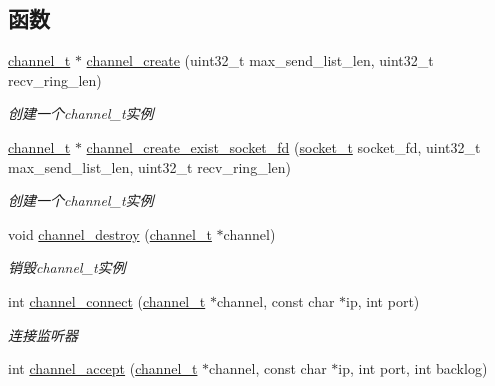 \subsection*{函数}
\begin{DoxyCompactItemize}
\item 
\hyperlink{a00050_a2effb3e20d0b7e5f6d5ac42118e0330b_a2effb3e20d0b7e5f6d5ac42118e0330b}{channel\+\_\+t} $\ast$ \hyperlink{a00045_ac2250584fc8b99ed26a4bbe4750cce61_ac2250584fc8b99ed26a4bbe4750cce61}{channel\+\_\+create} (uint32\+\_\+t max\+\_\+send\+\_\+list\+\_\+len, uint32\+\_\+t recv\+\_\+ring\+\_\+len)
\begin{DoxyCompactList}\small\item\em 创建一个channel\+\_\+t实例 \end{DoxyCompactList}\item 
\hyperlink{a00050_a2effb3e20d0b7e5f6d5ac42118e0330b_a2effb3e20d0b7e5f6d5ac42118e0330b}{channel\+\_\+t} $\ast$ \hyperlink{a00045_a9fe31ed96008befaf02f50568b59a199_a9fe31ed96008befaf02f50568b59a199}{channel\+\_\+create\+\_\+exist\+\_\+socket\+\_\+fd} (\hyperlink{a00050_a0d9e0afbf02fb6ed6c5b1415dce51b05_a0d9e0afbf02fb6ed6c5b1415dce51b05}{socket\+\_\+t} socket\+\_\+fd, uint32\+\_\+t max\+\_\+send\+\_\+list\+\_\+len, uint32\+\_\+t recv\+\_\+ring\+\_\+len)
\begin{DoxyCompactList}\small\item\em 创建一个channel\+\_\+t实例 \end{DoxyCompactList}\item 
void \hyperlink{a00045_ad7e93c006b66c9fa049a4233840cda05_ad7e93c006b66c9fa049a4233840cda05}{channel\+\_\+destroy} (\hyperlink{a00050_a2effb3e20d0b7e5f6d5ac42118e0330b_a2effb3e20d0b7e5f6d5ac42118e0330b}{channel\+\_\+t} $\ast$channel)
\begin{DoxyCompactList}\small\item\em 销毁channel\+\_\+t实例 \end{DoxyCompactList}\item 
int \hyperlink{a00045_a86caf9eb37ca45a77045cc5e10018afb_a86caf9eb37ca45a77045cc5e10018afb}{channel\+\_\+connect} (\hyperlink{a00050_a2effb3e20d0b7e5f6d5ac42118e0330b_a2effb3e20d0b7e5f6d5ac42118e0330b}{channel\+\_\+t} $\ast$channel, const char $\ast$ip, int port)
\begin{DoxyCompactList}\small\item\em 连接监听器 \end{DoxyCompactList}\item 
int \hyperlink{a00045_a8345afe1fa7e60dd9b12304809a96a7e_a8345afe1fa7e60dd9b12304809a96a7e}{channel\+\_\+accept} (\hyperlink{a00050_a2effb3e20d0b7e5f6d5ac42118e0330b_a2effb3e20d0b7e5f6d5ac42118e0330b}{channel\+\_\+t} $\ast$channel, const char $\ast$ip, int port, int backlog)

\end{DoxyCompactItemize}
